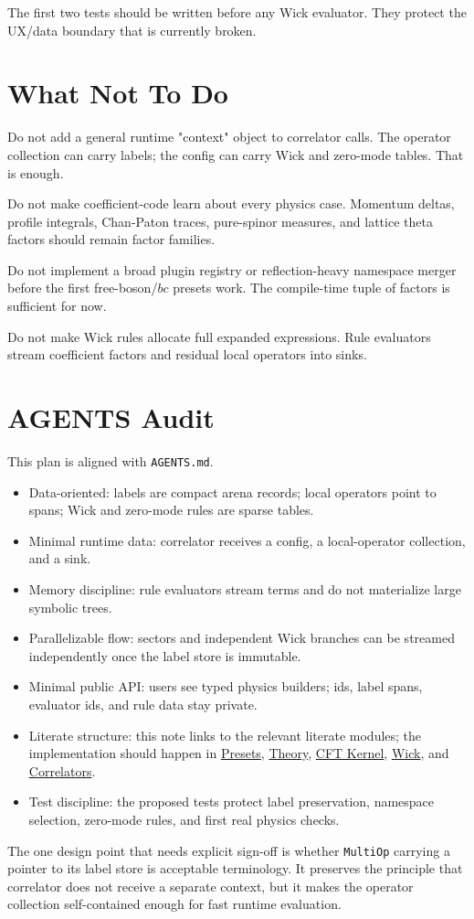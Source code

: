 \documentclass[11pt]{article}
\begin{document}
The first two tests should be written before any Wick evaluator.  They protect
the UX/data boundary that is currently broken.
\section{What Not To Do}
\label{sec:orgd4175c1}

Do not add a general runtime "context" object to correlator calls.  The operator
collection can carry labels; the config can carry Wick and zero-mode tables.
That is enough.

Do not make coefficient-code learn about every physics case.  Momentum deltas,
profile integrals, Chan-Paton traces, pure-spinor measures, and lattice theta
factors should remain factor families.

Do not implement a broad plugin registry or reflection-heavy namespace merger
before the first free-boson/\(bc\) presets work.  The compile-time tuple of
factors is sufficient for now.

Do not make Wick rules allocate full expanded expressions.  Rule evaluators
stream coefficient factors and residual local operators into sinks.
\section{AGENTS Audit}
\label{sec:orgc7e7f0d}

This plan is aligned with \texttt{AGENTS.md}.

\begin{itemize}
\item Data-oriented: labels are compact arena records; local operators point to
spans; Wick and zero-mode rules are sparse tables.
\item Minimal runtime data: correlator receives a config, a local-operator
collection, and a sink.
\item Memory discipline: rule evaluators stream terms and do not materialize large
symbolic trees.
\item Parallelizable flow: sectors and independent Wick branches can be streamed
independently once the label store is immutable.
\item Minimal public API: users see typed physics builders; ids, label spans,
evaluator ids, and rule data stay private.
\item Literate structure: this note links to the relevant literate modules; the
implementation should happen in \href{../org/cft-code/presets/presets.org}{Presets}, \href{../org/cft-code/theory/theory.org}{Theory},
\href{../org/cft-code/kernel/cft-kernel.org}{CFT Kernel}, \href{../org/cft-code/correlators/wick.org}{Wick}, and
\href{../org/cft-code/correlators/correlators.org}{Correlators}.
\item Test discipline: the proposed tests protect label preservation, namespace
selection, zero-mode rules, and first real physics checks.
\end{itemize}

The one design point that needs explicit sign-off is whether \texttt{MultiOp} carrying
a pointer to its label store is acceptable terminology.  It preserves the
principle that correlator does not receive a separate context, but it makes the
operator collection self-contained enough for fast runtime evaluation.
\end{document}
